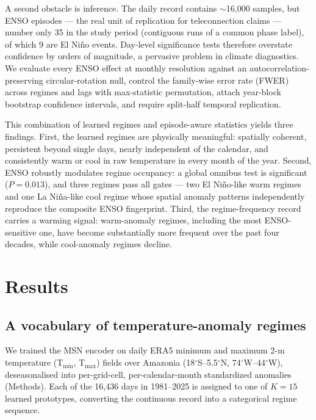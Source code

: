 \documentclass[pdflatex,sn-nature]{sn-jnl}
\begin{document}
A second obstacle is inference. The daily record contains $\sim$16{,}000 samples, but ENSO episodes --- the real unit of replication for teleconnection claims --- number only 35 in the study period (contiguous runs of a common phase label), of which 9 are El Ni\~no events. Day-level significance tests therefore overstate confidence by orders of magnitude, a pervasive problem in climate diagnostics\cite{wilks2016stippling}. We evaluate every ENSO effect at monthly resolution against an autocorrelation-preserving circular-rotation null\cite{ebisuzaki1997method}, control the family-wise error rate (FWER) across regimes and lags with max-statistic permutation, attach year-block bootstrap confidence intervals, and require split-half temporal replication.

This combination of learned regimes and episode-aware statistics yields three findings. First, the learned regimes are physically meaningful: spatially coherent, persistent beyond single days, nearly independent of the calendar, and consistently warm or cool in raw temperature in every month of the year. Second, ENSO robustly modulates regime occupancy: a global omnibus test is significant ($P = 0.013$), and three regimes pass all gates --- two El Ni\~no-like warm regimes and one La Ni\~na-like cool regime whose spatial anomaly patterns independently reproduce the composite ENSO fingerprint. Third, the regime-frequency record carries a warming signal: warm-anomaly regimes, including the most ENSO-sensitive one, have become substantially more frequent over the past four decades, while cool-anomaly regimes decline.

\section{Results}\label{sec:results}

\subsection{A vocabulary of temperature-anomaly regimes}\label{sec:vocab}

We trained the MSN encoder on daily ERA5 minimum and maximum 2-m temperature (T$_{\min}$, T$_{\max}$) fields over Amazonia (18$^\circ$S--5.5$^\circ$N, 74$^\circ$W--44$^\circ$W), deseasonalised into per-grid-cell, per-calendar-month standardized anomalies (Methods). Each of the 16{,}436 days in 1981--2025 is assigned to one of $K = 15$ learned prototypes, converting the continuous record into a categorical regime sequence.
\end{document}
